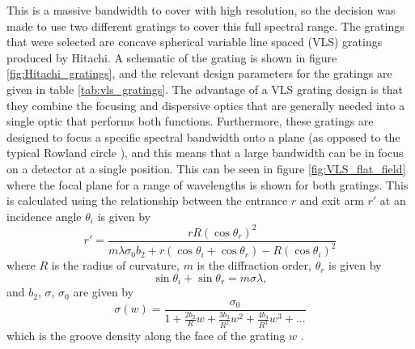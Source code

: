 This is a massive bandwidth to cover with high resolution, so the decision was made to use two different gratings to cover this full spectral range.  The gratings that were selected are concave spherical variable line spaced (VLS) gratings produced by Hitachi.  A schematic of the grating is shown in figure \ref{fig:Hitachi_gratings}, and the relevant design parameters for the gratings are given in table \ref{tab:vls_gratings}.  The advantage of a VLS grating design is that they combine the focusing and dispersive optics that are generally needed into a single optic that performs both functions.  Furthermore, these gratings are designed to focus a specific spectral bandwidth onto a plane (as opposed to the typical Rowland circle \cite{rowlandConcaveGratingsOptical1883, pedrottiIntroductionOptics2007}), and this means that a large bandwidth can be in focus on a detector at a single position.  This can be seen in figure \ref{fig:VLS_flat_field} where the focal plane for a range of wavelengths is shown for both gratings. This is calculated using the relationship between the entrance $r$ and exit arm $r'$ at an incidence angle $\theta_i$ is given by
\begin{equation}
	r' = \frac{r R (\cos\theta_r)^2}{m\lambda\sigma_0 b_2 + r(\cos\theta_i + \cos\theta_r) - R(\cos\theta_i)^2}
\end{equation}
where $R$ is the radius of curvature, $m$ is the diffraction order, $\theta_r$ is given by
\begin{equation}
	\sin\theta_i + \sin\theta_r = m\sigma\lambda,
\end{equation}
and $b_2$, $\sigma$, $\sigma_0$ are given by 
\begin{equation}
	\sigma(w) = \frac{\sigma_0}{1 + \frac{2b_2}{R}w + \frac{3b_3}{R^2}w^2 + \frac{4b_4}{R^3}w^3 + ...}
\end{equation}
which is the groove density along the face of the grating $w$ \cite{polettoGrazingincidenceFlatfieldSpectrometer2001, haradaMechanicallyRuledAberrationcorrected1980, haradaOptimumDesignGrazingincidence1999}.
